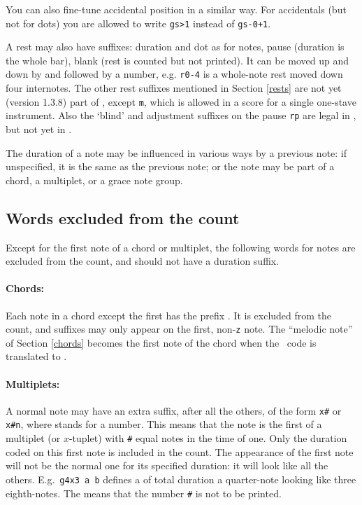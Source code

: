 \documentclass[11pt]{article}
\begin{document}
You can also fine-tune accidental position in a similar way.  For
accidentals (but not for dots) you are allowed to write \verb"gs>1"
instead of \verb"gs-0+1".

  A rest may also have suffixes: duration and \mark dot as for notes,
\mark pause (duration is the whole bar), \mark blank (rest is 
counted but not printed).    
It can be moved up and down by \ttxem{+} and 
\ttxem{-} followed by a number, e.g. \texttt{r0-4} is a whole-note rest 
moved down four internotes.  The other rest suffixes mentioned
in Section \ref{rests} are not yet (version 1.3.8) part of \PMX, 
except \texttt{m}, which is allowed in a score for a single one-stave 
instrument.    Also the `blind' and adjustment suffixes on the pause 
\texttt{rp} are legal in \MTx, but not yet in \PMX.

 The duration of a note may be influenced in various ways by a previous
note: if unspecified, it is the same as the previous note; or the note 
may be part of a chord, a multiplet, or a grace note group.

 \subsection{Words excluded from the count} 

Except for the first note of a chord or multiplet, the following words 
for notes are excluded from the count, and should not have a duration 
suffix. 

\paragraph*{Chords:} Each note in a chord except the first has the 
prefix .  It is excluded from the count, and suffixes 
    may only appear on the first, 
non-\texttt{z} note. 
The ``melodic note'' of Section \ref{chords} becomes the first note
of the chord when the \MTx\ code is translated to \PMX.

\paragraph*{Multiplets:} A normal note may have an extra suffix, after 
all the others, of the form \verb"x#"  
or \verb"x#n", where \ttxem{\#} 
stands for a number.  This means that the note is the first of a 
multiplet (or $x$-tuplet) with \verb"#" equal notes in the time of one.  
Only the duration coded on this first note is included in the count. The 
appearance of the first note will not be the normal one for its 
specified duration: it will look like all the others.  
E.g.~\verb"g4x3 a b" defines a  of total duration a quarter-note 
looking like three eighth-notes. The  means that the number 
\verb"#" is not to be printed. 
\end{document}
